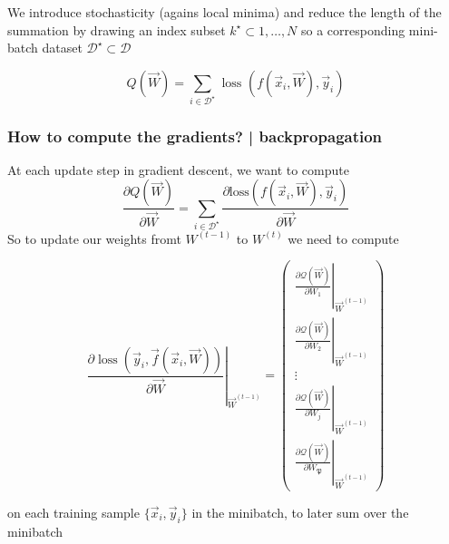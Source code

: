 We introduce stochasticity (agains local minima) and reduce the length of the summation
by drawing an index subset $k^\star \subset 1, \ldots, N$ so a corresponding mini-batch
dataset $\mathcal{D}^\star \subset \mathcal{D}$

\begin{equation}
    Q(\vec{W})=\sum_{i \in \mathcal{D}^\star} \text { loss }\left(f\left(\vec{x}_{i}, \vec{W}\right), \vec{y}_{i}\right)
\end{equation}

\subsubsection{How to compute the gradients? | backpropagation}
At each update step in gradient descent, we want to compute
\begin{equation}
    \frac{\partial Q(\vec{W})}{\partial \vec{W}} = \sum_{i \in \mathcal{D}^\star} \frac{\partial \text{loss}\left(f\left(\vec{x}_{i}, \vec{W}\right), \vec{y}_{i}\right)}{\partial \vec{W}}
\end{equation}
So to update our weights fromt $W^{(t-1)}$ to $W^{(t)}$ we need to compute

\begin{equation}
    \left.\frac{\partial \operatorname{loss}\left(\vec{y}_i, \vec{f}\left(\vec{x}_i, \vec{W}\right)\right)}{\partial \vec{W}}\right|_{\vec{W}^{(t-1)}}=\left(\begin{array}{c}
    \left.\frac{\partial \mathcal{Q}(\vec{W})}{\partial W_1}\right|_{\vec{W}^{(t-1)}} \\
    \left.\frac{\partial \mathcal{Q}(\vec{W})}{\partial W_2}\right|_{\vec{W}^{(t-1)}} \\
    \vdots \\
    \left.\frac{\partial \mathcal{Q}(\vec{W})}{\partial W_j}\right|_{\vec{W}^{(t-1)}} \\
    \left.\frac{\partial \mathcal{Q}(\vec{W})}{\partial W_{\mathfrak{P}}}\right|_{\vec{W}^{(t-1)}}
    \end{array}\right)
\end{equation}

on each training sample $\{ \vec{x}_i,\vec{y}_i \}$ in the minibatch, to later sum over the minibatch

